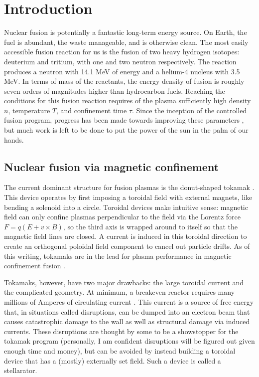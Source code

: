 \graphicspath{{Chapters/Chapter_intro/}}

\chapter{Introduction}
\label{ch:intro}

Nuclear fusion is potentially a fantastic long-term energy source. On Earth, the fuel is abundant, the waste manageable, and is otherwise clean. The most easily accessible fusion reaction for us is the fusion of two heavy hydrogen isotopes: deuterium and tritium, with one and two neutron respectively. The reaction produces a neutron with 14.1 MeV of energy and a helium-4 nucleus with 3.5 MeV. In terms of mass of the reactants, the energy density of fusion is roughly seven orders of magnitudes higher than hydrocarbon fuels. Reaching the conditions for this fusion reaction requires of the plasma sufficiently high density $n$, temperature $T$, and confinement time $\tau$. Since the inception of the controlled fusion program, progress has been made towards improving these parameters \cite{wurzel_progress_2022}, but much work is left to be done to put the power of the sun in the palm of our hands.

\section{Nuclear fusion via magnetic confinement}

The current dominant structure for fusion plasmas is the donut-shaped tokamak \cite{john_wesson_tokamaks_2004}. This device operates by first imposing a toroidal field with external magnets, like bending a solenoid into a circle. Toroidal devices make intuitive sense: magnetic field can only confine plasmas perpendicular to the field via the Lorentz force $F = q(E + v \times B)$, so the third axis is wrapped around to itself so that the magnetic field lines are closed. A current is induced in this toroidal direction to create an orthogonal poloidal field component to cancel out particle drifts. As of this writing, tokamaks are in the lead for plasma performance in magnetic confinement fusion \cite{wurzel_progress_2022}.

Tokamaks, however, have two major drawbacks: the large toroidal current and the complicated geometry. At minimum, a breakeven reactor requires many millions of Amperes of circulating current \cite{creely_overview_2020}. This current is a source of free energy that, in situations called disruptions, can be dumped into an electron beam that causes catastrophic damage to the wall as well as structural damage via induced currents. These disruptions are thought by some to be a showstopper for the tokamak program (personally, I am confident disruptions will be figured out given enough time and money), but can be avoided by instead building a toroidal device that has a (mostly) externally set field. Such a device is called a stellarator.

